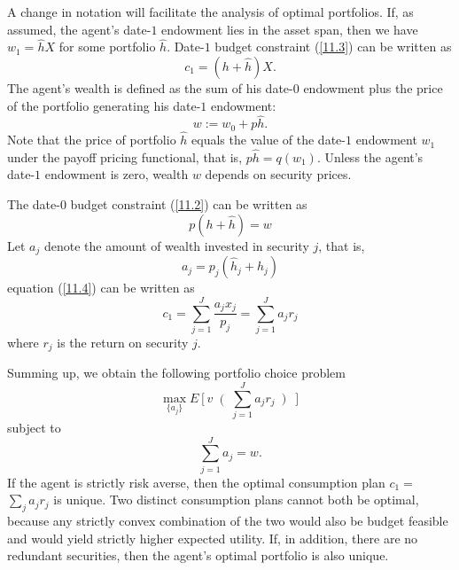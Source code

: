 \documentclass[\topdir/lecture\_notes.tex]{subfiles}
\begin{document}
A change in notation will facilitate the analysis of optimal portfolios. If, as assumed, the agent's date-\(1\) endowment lies in the asset span, then we have \(w_{1}=\hat{h} X\) for some portfolio \(\hat{h}\). Date-\(1\) budget constraint (\ref{11.3}) can be written as
\begin{equation}
c_{1}=(h+\hat{h}) X. \label{11.3}
\end{equation}
The agent's wealth is defined as the sum of his date-\(0\) endowment plus the price of the portfolio generating his date-\(1\) endowment:
\begin{equation}
w := w_{0}+p \hat{h}. \label{eq:wealth_definition} 
\end{equation}
Note that the price of portfolio \(\hat{h}\) equals the value of the date-\(1\) endowment \(w_{1}\) under the payoff pricing functional, that is, \(p \hat{h}=q\left(w_{1}\right)\). Unless the agent's date-\(1\) endowment is zero, wealth \(w\) depends on security prices.

The date-\(0\) budget constraint (\ref{11.2}) can be written as
\begin{equation}
p(h+\hat{h})=w \label{11.4}
\end{equation}
Let \(a_{j}\) denote the amount of wealth invested in security \(j\), that is,
\begin{equation*}
a_{j}=p_{j}(\hat{h}_{j}+h_{j}) 
\end{equation*}
equation (\ref{11.4}) can be written as
\begin{equation*}
c_{1}=\sum_{j=1}^{J} \frac{a_{j} x_{j}}{p_{j}}=\sum_{j=1}^{J} a_{j} r_{j} 
\end{equation*}
where \(r_{j}\) is the return on security \(j\).

Summing up, we obtain the following portfolio choice problem
\begin{equation}
\max _{\{a_{j}\}} E\left[v\right(\sum_{j=1}^{J} a_{j} r_{j}\left)\right] \label{11.9}
\end{equation}
subject to
\begin{equation}
\sum_{j=1}^{J} a_{j}=w. \label{11.10}
\end{equation}
If the agent is strictly risk averse, then the optimal consumption plan \(c_{1}=\) \(\sum_{j} a_{j} r_{j}\) is unique. Two distinct consumption plans cannot both be optimal, because any strictly convex combination of the two would also be budget feasible and would yield strictly higher expected utility. If, in addition, there are no redundant securities, then the agent's optimal portfolio is also unique.
\end{document}
